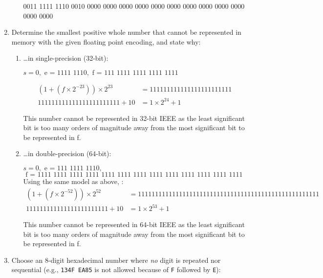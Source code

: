 \documentclass[11pt]{article}
\begin{document}
\begin{enumerate}
\begin{enumerate}
0011 1111 1110 0010 0000 0000 0000 0000 0000 0000 0000 0000 0000 0000 0000 0000

\end{enumerate}

\item Determine the smallest positive whole number that cannot be represented in memory with the
given floating point encoding, and state why:

\begin{enumerate}
\item \ldots in single-precision (32-bit):

$s = 0,\text{ e = 1111 1110},\text{ f = 111 1111 1111 1111 1111}$

\begin{align*}
(1 + (f \times 2^{-23})) \times 2^{23} &= 1111 1111 1111 1111 1111 1111 \\
1111 1111 1111 1111 1111 1111 + 10 &= \boxed{1\times2^{24} + 1}
\end{align*}

This number cannot be represented in 32-bit IEEE as the least significant bit is too many orders of magnitude away from the most significant bit to be represented in f.

\item \ldots in double-precision (64-bit):

$s = 0,\text{ e = 111 1111 1110},$\\$\text{ f = 1111 1111 1111 1111 1111 1111 1111 1111 1111 1111 1111 1111 1111}$\\


Using the same model as above, :\\

\begin{align*}
(1 + (f \times 2^{-52})) \times 2^{52} &= 1 1111 1111 1111 1111 1111 1111 1111 1111 1111 1111 1111 1111 1111\\
1111 1111 1111 1111 1111 1111 + 10 &= \boxed{1\times2^{53} + 1}
\end{align*}

This number cannot be represented in 64-bit IEEE as the least significant bit is too many orders of magnitude away from the most significant bit to be represented in f.

\end{enumerate}

\item Choose an 8-digit hexadecimal number where \emph{no} digit is repeated nor sequential
(e.g., \texttt{134F EA85} is not allowed because of \texttt{F} followed by \texttt{E}):


\end{enumerate}
\end{document}
